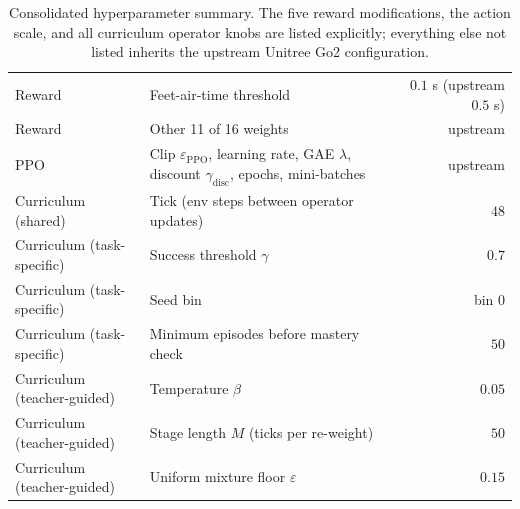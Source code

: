 \begin{table}[ht]
\begin{tabularx}{\textwidth}{@{}l l r@{}}
Reward     & Feet-air-time threshold & $0.1$ s (upstream $0.5$ s) \\
Reward     & Other 11 of 16 weights & upstream \\
\addlinespace
PPO        & Clip $\varepsilon_{\mathrm{PPO}}$, learning rate, GAE $\lambda$, discount $\gamma_{\mathrm{disc}}$, epochs, mini-batches & upstream \\
\addlinespace
Curriculum (shared)          & Tick (env steps between operator updates) & $48$ \\
Curriculum (task-specific)   & Success threshold $\gamma$ & $0.7$ \\
Curriculum (task-specific)   & Seed bin & bin $0$ \\
Curriculum (task-specific)   & Minimum episodes before mastery check & $50$ \\
Curriculum (teacher-guided)  & Temperature $\beta$ & $0.05$ \\
Curriculum (teacher-guided)  & Stage length $M$ (ticks per re-weight) & $50$ \\
Curriculum (teacher-guided)  & Uniform mixture floor $\varepsilon$ & $0.15$ \\
\bottomrule
\end{tabularx}
\caption{Consolidated hyperparameter summary. The five reward modifications, the action scale, and all curriculum operator knobs are listed explicitly; everything else not listed inherits the upstream Unitree Go2 configuration.}
\label{tab:hyperparams}
\end{table}
